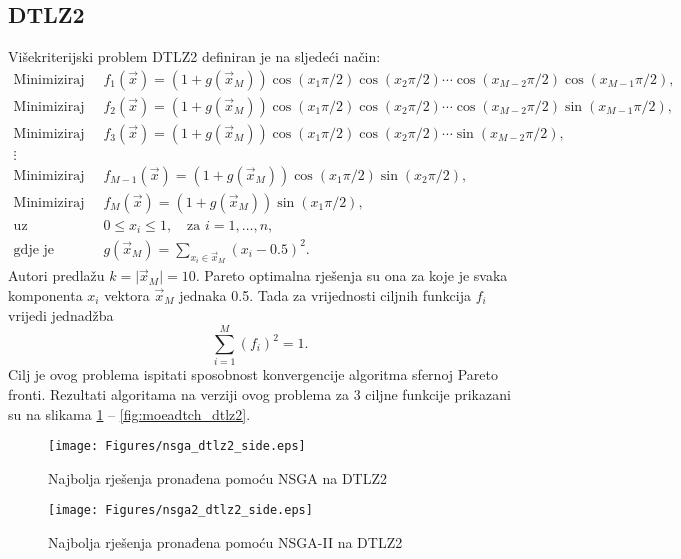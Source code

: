 \documentclass[times, utf8, zavrsni, numeric]{fer}
\begin{document}
\subsection{DTLZ2}
Višekriterijski problem DTLZ2 definiran je na sljedeći način:
\begin{align*}
\mbox{Minimiziraj }\: &f_1(\vec{x}) = (1 + g(\vec{x}_M))\cos{(x_1\pi/2)}\cos{(x_2\pi/2)}\cdots\cos{(x_{M - 2}\pi/2)}\cos{(x_{M - 1}\pi/2)},\\
\mbox{Minimiziraj }\: &f_2(\vec{x}) = (1 + g(\vec{x}_M))\cos{(x_1\pi/2)}\cos{(x_2\pi/2)}\cdots\cos{(x_{M - 2}\pi/2)}\sin{(x_{M - 1}\pi/2)},\\
\mbox{Minimiziraj }\: &f_3(\vec{x}) = (1 + g(\vec{x}_M))\cos{(x_1\pi/2)}\cos{(x_2\pi/2)}\cdots\sin{(x_{M - 2}\pi/2)},\\
\vdots\\
\mbox{Minimiziraj }\: &f_{M-1}(\vec{x}) = (1 + g(\vec{x}_M))\cos{(x_1\pi/2)}\sin{(x_2\pi/2)},\\
\mbox{Minimiziraj }\: &f_{M}(\vec{x}) = (1 + g(\vec{x}_M))\sin{(x_1\pi/2)},\\
\mbox{uz ograničenja }\: &0 \leq x_i \leq 1, \quad \text{za } i = 1,\dots, n,\\
\mbox{gdje je }\: &g(\vec{x}_M) = \sum_{x_i \in \vec{x}_M}{(x_i - 0.5)^2}.
\end{align*}
Autori predlažu $k = \vert\vec{x}_M\vert = 10$. Pareto optimalna rješenja su ona za koje je svaka komponenta $x_i$ vektora $\vec{x}_M$ jednaka 0.5. Tada za vrijednosti ciljnih funkcija $f_i$ vrijedi jednadžba
\begin{equation}
\sum_{i = 1}^M{(f_i)^2} = 1.
\label{eq:sphere}
\end{equation}
Cilj je ovog problema ispitati sposobnost konvergencije algoritma sfernoj Pareto fronti. Rezultati algoritama na verziji ovog problema za 3 ciljne funkcije prikazani su na slikama \ref{fig:nsga_dtlz2} -- \ref{fig:moeadtch_dtlz2}.

\begin{figure}[htb]
\centering
\texttt{[image: Figures/nsga\_dtlz2\_side.eps]}
\caption{Najbolja rješenja pronađena pomoću NSGA na DTLZ2}
\label{fig:nsga_dtlz2}
\end{figure}

\begin{figure}[htb]
\centering
\texttt{[image: Figures/nsga2\_dtlz2\_side.eps]}
\caption{Najbolja rješenja pronađena pomoću NSGA-II na DTLZ2}
\label{fig:nsgaii_dtlz2}
\end{figure}
\end{document}
